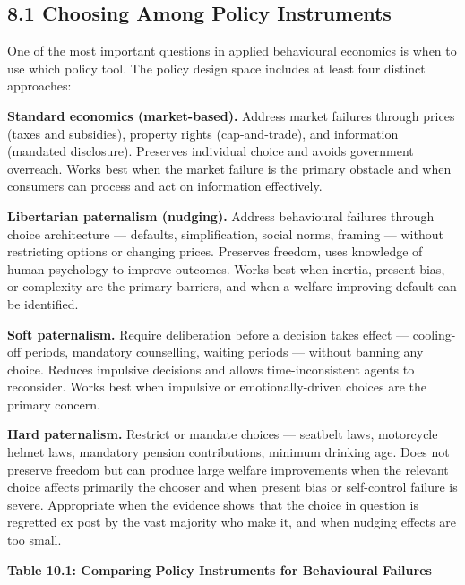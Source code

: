 \documentclass[12pt, letterpaper]{article}
\begin{document}
\subsection{8.1 Choosing Among Policy Instruments}


One of the most important questions in applied behavioural economics is when to use which policy tool. The policy design space includes at least four distinct approaches:

\textbf{Standard economics (market-based).} Address market failures through prices (taxes and subsidies), property rights (cap-and-trade), and information (mandated disclosure). Preserves individual choice and avoids government overreach. Works best when the market failure is the primary obstacle and when consumers can process and act on information effectively.

\textbf{Libertarian paternalism (nudging).} Address behavioural failures through choice architecture --- defaults, simplification, social norms, framing --- without restricting options or changing prices. Preserves freedom, uses knowledge of human psychology to improve outcomes. Works best when inertia, present bias, or complexity are the primary barriers, and when a welfare-improving default can be identified.

\textbf{Soft paternalism.} Require deliberation before a decision takes effect --- cooling-off periods, mandatory counselling, waiting periods --- without banning any choice. Reduces impulsive decisions and allows time-inconsistent agents to reconsider. Works best when impulsive or emotionally-driven choices are the primary concern.

\textbf{Hard paternalism.} Restrict or mandate choices --- seatbelt laws, motorcycle helmet laws, mandatory pension contributions, minimum drinking age. Does not preserve freedom but can produce large welfare improvements when the relevant choice affects primarily the chooser and when present bias or self-control failure is severe. Appropriate when the evidence shows that the choice in question is regretted ex post by the vast majority who make it, and when nudging effects are too small.

\textbf{Table 10.1: Comparing Policy Instruments for Behavioural Failures}
\end{document}
